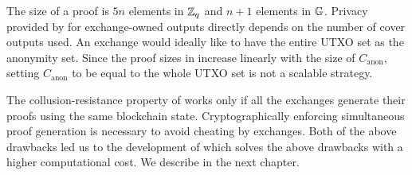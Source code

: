The size of a \R proof is $5n$ elements in $\mathbb{Z}_q$ and $n+1$ elements in $\mathbb{G}$.
Privacy provided by \R for exchange-owned outputs directly depends on the number of cover outputs used.
An exchange would ideally like to have the entire UTXO set as the anonymity set. 
Since the proof sizes in \R increase linearly
with the size of $C_{\text{anon}}$, setting $C_{\text{anon}}$ to be equal
to the whole UTXO set is not a scalable strategy.

The collusion-resistance property of \R works only
if all the exchanges generate their proofs using the same
blockchain state.
Cryptographically enforcing simultaneous proof generation is necessary to avoid cheating by exchanges.
Both of the above drawbacks led us to the development of \RB which solves the above drawbacks with a higher computational cost.
We describe \RB in the next chapter. 